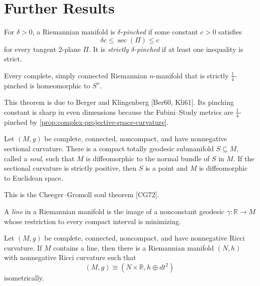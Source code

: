 \section{Further Results}

For $\delta>0$, a Riemannian manifold is \emph{$\delta$-pinched} if some
constant $c>0$ satisfies
\[
\delta c\leq\sec(\Pi)\leq c
\]
for every tangent $2$-plane $\Pi$. It is \emph{strictly
$\delta$-pinched} if at least one inequality is strict.

\begin{theorem}
\label{thm:sphere-theorem}

Every complete, simply connected Riemannian $n$-manifold that is strictly
$\frac14$-pinched is homeomorphic to $S^n$.
\end{theorem}

This theorem is due to Berger and Klingenberg [Ber60, Kli61]. Its pinching
constant is sharp in even dimensions because the Fubini--Study metrics are
$\frac14$-pinched by \cref{prop:complex-projective-space-curvature}.

\begin{theorem}
\label{thm:soul-theorem}


Let $(M,g)$ be complete, connected, noncompact, and have nonnegative
sectional curvature. There is a compact totally geodesic submanifold
$S\subseteq M$, called a \emph{soul}, such that $M$ is diffeomorphic to the
normal bundle of $S$ in $M$. If the sectional curvature is strictly positive,
then $S$ is a point and $M$ is diffeomorphic to Euclidean space.
\end{theorem}

This is the Cheeger--Gromoll soul theorem [CG72].

A \emph{line} in a Riemannian manifold is the image of a nonconstant geodesic
$\gamma:\mathbb R\to M$ whose restriction to every compact interval is
minimizing.

\begin{theorem}
\label{thm:splitting-theorem}

Let $(M,g)$ be complete, connected, noncompact, and have nonnegative Ricci
curvature. If $M$ contains a line, then there is a Riemannian manifold
$(N,h)$ with nonnegative Ricci curvature such that
\[
(M,g)\cong(N\times\mathbb R,h\oplus dt^2)
\]
isometrically.
\end{theorem}

